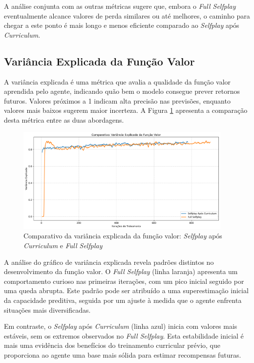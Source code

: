 A análise conjunta com as outras métricas sugere que, embora o \textit{Full Selfplay} eventualmente alcance valores de perda similares ou até melhores, o caminho para chegar a este ponto é mais longo e menos eficiente comparado ao \textit{Selfplay} após \textit{Curriculum}.

\subsection{Variância Explicada da Função Valor}

A variância explicada é uma métrica que avalia a qualidade da função valor aprendida pelo agente, indicando quão bem o modelo consegue prever retornos futuros. Valores próximos a 1 indicam alta precisão nas previsões, enquanto valores mais baixos sugerem maior incerteza. A Figura \ref{fig:explained_variance} apresenta a comparação desta métrica entre as duas abordagens.

\begin{figure}[H]
    \centering
    \includegraphics[width=0.95\textwidth]{fig/graficos_trabalho/graficos_experimentos/geral/comparativo_variancia_explicada.png}
    \caption{Comparativo da variância explicada da função valor: \textit{Selfplay} após \textit{Curriculum} e \textit{Full Selfplay}}
    \label{fig:explained_variance}
\end{figure}

A análise do gráfico de variância explicada revela padrões distintos no desenvolvimento da função valor. O \textit{Full Selfplay} (linha laranja) apresenta um comportamento curioso nas primeiras iterações, com um pico inicial seguido por uma queda abrupta. Este padrão pode ser atribuído a uma superestimação inicial da capacidade preditiva, seguida por um ajuste à medida que o agente enfrenta situações mais diversificadas.

Em contraste, o \textit{Selfplay} após \textit{Curriculum} (linha azul) inicia com valores mais estáveis, sem os extremos observados no \textit{Full Selfplay}. Esta estabilidade inicial é mais uma evidência dos benefícios do treinamento curricular prévio, que proporciona ao agente uma base mais sólida para estimar recompensas futuras.

